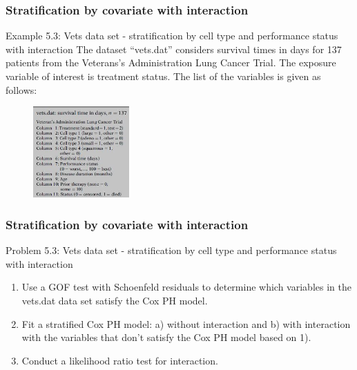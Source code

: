 \documentclass{beamer}
\theoremstyle{definition}
\begin{document}
\begin{frame}
\frametitle{Stratification by covariate with interaction}
\begin{block}{Example 5.3: Vets data set - stratification by cell type and performance status with interaction}
The dataset ``vets.dat'' considers survival times in days for 137 patients from the Veterans's Administration Lung Cancer Trial. The exposure variable of interest is treatment status. 
The list of the variables is given as follows: 
\begin{figure}
    \centering
    \includegraphics[height=3.5cm]{Ch5_vets.JPG}
  \end{figure}
\end{block}
\end{frame}

\begin{frame}
\frametitle{Stratification by covariate with interaction}
\begin{block}{Problem 5.3: Vets data set - stratification by cell type and performance status with interaction}
\begin{enumerate} 
\item Use a GOF test with Schoenfeld residuals to determine which variables in the vets.dat data set satisfy the Cox PH model. 
\item Fit a stratified Cox PH model: a) without interaction and b) with interaction with the variables that don't satisfy the Cox PH model based on 1). 
\item Conduct a likelihood ratio test for interaction. 
\end{enumerate} 
\end{block} 
\end{frame} 
\end{document}
